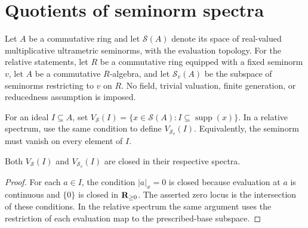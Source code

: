 \section{Quotients of seminorm spectra}\label{sec:general-spectrum-quotients}

Let $A$ be a commutative ring and let $\mathcal S(A)$ denote its space of
real-valued multiplicative ultrametric seminorms, with the evaluation topology.
For the relative statements, let $R$ be a commutative ring equipped with a fixed
seminorm $v$, let $A$ be a commutative $R$-algebra, and let $\mathcal S_v(A)$
be the subspace of seminorms restricting to $v$ on $R$.
No field, trivial valuation, finite generation, or reducedness assumption is imposed.

\begin{definition}\label{spectrum:quotient-zero-locus}
\leanok
{}
For an ideal $I\subseteq A$, set
$V_{\mathcal S}(I)=\{x\in\mathcal S(A):I\subseteq\operatorname{supp}(x)\}$.
In a relative spectrum, use the same condition to define $V_{\mathcal S_v}(I)$.
Equivalently, the seminorm must vanish on every element of $I$.
\end{definition}

\begin{lemma}\label{spectrum:quotient-zero-locus-closed}
\leanok
{}
Both $V_{\mathcal S}(I)$ and $V_{\mathcal S_v}(I)$ are closed in their respective spectra.
\end{lemma}
\begin{proof}
For each $a\in I$, the condition $|a|_x=0$ is closed because evaluation at $a$
is continuous and $\{0\}$ is closed in $\mathbf{R}_{\ge0}$. The asserted zero locus is
the intersection of these conditions. In the relative spectrum the same argument
uses the restriction of each evaluation map to the prescribed-base subspace.
\end{proof}


